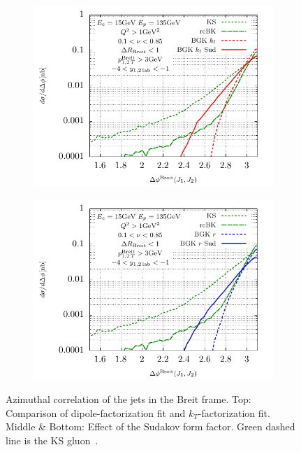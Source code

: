 \documentclass[12pt]{article}
\numberwithin{equation}{section}
\numberwithin{table}{section}
\numberwithin{figure}{section}
\begin{document}
\begin{figure}[p]
	\begin{subfigure}{0.5\textwidth}
		\includegraphics[width=\textwidth]{plots/plotBGK2Jets}
	\end{subfigure}
	\begin{subfigure}{0.5\textwidth}
		\includegraphics[width=\textwidth]{plots/plotBGK3Jets}
	\end{subfigure}
\caption{\footnotesize Azimuthal correlation of the jets in the Breit frame. Top: Comparison of dipole-factorization fit and $k_T$-factorization fit. Middle \& Bottom: Effect of the Sudakov form factor. Green dashed line is the KS gluon~\cite{vanHameren:2021sqc}. }
\label{fig:jj-breit}
\end{figure}
\end{document}
